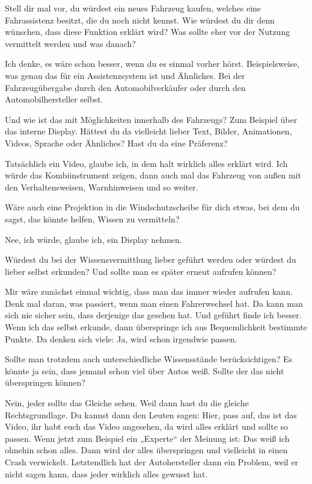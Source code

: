 \interviewerin
Stell dir mal vor, du würdest ein neues Fahrzeug kaufen, welches eine
Fahrassistenz besitzt, die du noch nicht kennst. Wie würdest du dir denn
wünschen, dass diese Funktion erklärt wird? Was sollte eher vor der
Nutzung vermittelt werden und was danach?

Ich denke, es wäre schon besser, wenn du es einmal vorher hörst.
Beispielsweise, was genau das für ein Assistenzsystem ist und Ähnliches.
Bei der Fahrzeugübergabe durch den Automobilverkäufer oder durch den
Automobilhersteller selbst.

\interviewerin
Und wie ist das mit Möglichkeiten innerhalb des Fahrzeugs? Zum Beispiel
über das interne Display. Hättest du da vielleicht lieber Text, Bilder,
Animationen, Videos, Sprache oder Ähnliches? Hast du da eine Präferenz?

Tatsächlich ein Video, glaube ich, in dem halt wirklich alles erklärt
wird. Ich würde das Kombiinstrument zeigen, dann auch mal das Fahrzeug
von außen mit den Verhaltensweisen, Warnhinweisen und so weiter.

\interviewerin
Wäre auch eine Projektion in die Windschutzscheibe für dich etwas, bei
dem du sagst, das könnte helfen, Wissen zu vermitteln?

Nee, ich würde, glaube ich, ein Display nehmen.

\interviewerin
Würdest du bei der Wissensvermittlung lieber geführt werden oder würdest
du lieber selbst erkunden? Und sollte man es später erneut aufrufen
können?

Mir wäre zunächst einmal wichtig, dass man das immer wieder aufrufen
kann. Denk mal daran, was passiert, wenn man einen Fahrerwechsel hat.
Da kann man sich nie sicher sein, dass derjenige das gesehen hat. Und
geführt finde ich besser. Wenn ich das selbst erkunde, dann überspringe
ich aus Bequemlichkeit bestimmte Punkte. Da denken sich viele: Ja, wird
schon irgendwie passen.

\interviewerin
Sollte man trotzdem auch unterschiedliche Wissensstände berücksichtigen?
Es könnte ja sein, dass jemand schon viel über Autos weiß. Sollte der
das nicht überspringen können?

Nein, jeder sollte das Gleiche sehen. Weil dann hast du die gleiche
Rechtsgrundlage. Du kannst dann den Leuten sagen: Hier, pass auf, das
ist das Video, ihr habt euch das Video angesehen, da wird alles erklärt
und sollte so passen. Wenn jetzt zum Beispiel ein „Experte“ der Meinung
ist: Das weiß ich ohnehin schon alles. Dann wird der alles überspringen
und vielleicht in einen Crash verwickelt. Letztendlich hat der
Autohersteller dann ein Problem, weil er nicht sagen kann, dass jeder
wirklich alles gewusst hat.

